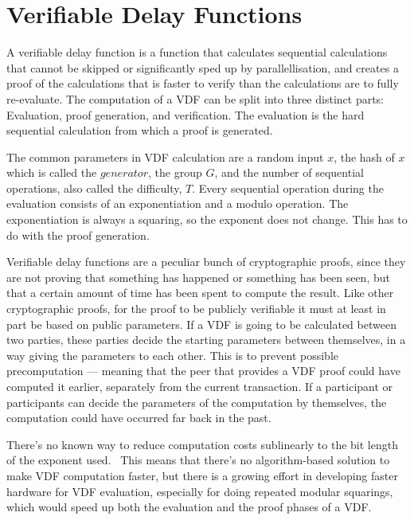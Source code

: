 \section{Verifiable Delay Functions}

A verifiable delay function is a function that calculates sequential calculations that cannot be skipped or significantly sped up by parallellisation, and creates a proof of the calculations that is faster to verify than the calculations are to fully re-evaluate. The computation of a VDF can be split into three distinct parts: Evaluation, proof generation, and verification. The evaluation is the hard sequential calculation from which a proof is generated.~\cite{Boneh2018-sm}

The common parameters in VDF calculation are a random input \(x\), the hash of \(x\) which is called the \(generator\), the group \(G\), and the number of sequential operations, also called the difficulty, \(T\). Every sequential operation during the evaluation consists of an exponentiation and a modulo operation. The exponentiation is always a squaring, so the exponent does not change. This has to do with the proof generation.

Verifiable delay functions are a peculiar bunch of cryptographic proofs, since they are not proving that something has happened or something has been seen, but that a certain amount of time has been spent to compute the result. Like other cryptographic proofs, for the proof to be publicly verifiable it must at least in part be based on public parameters. If a VDF is going to be calculated between two parties, these parties decide the starting parameters between themselves, in a way giving the parameters to each other. This is to prevent possible precomputation --- meaning that the peer that provides a VDF proof could have computed it earlier, separately from the current transaction. If a participant or participants can decide the parameters of the computation by themselves, the computation could have occurred far back in the past.

There's no known way to reduce computation costs sublinearly to the bit length of the exponent used.~\cite{Boneh2018-sm} This means that there's no algorithm-based solution to make VDF computation faster, but there is a growing effort in developing faster hardware for VDF evaluation, especially for doing repeated modular squarings, which would speed up both the evaluation and the proof phases of a VDF.~\cite{noauthor_undated-jb, noauthor_undated-da, noauthor_2020-ki}

